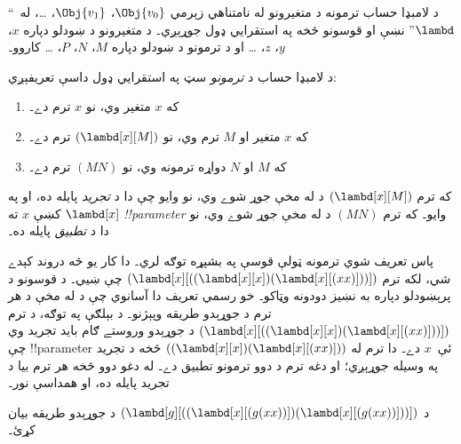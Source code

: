 \documentclass[../../../include/open-logic-section]{subfiles}
\begin{document}

د لامبډا حساب ترمونه د متغيرونو له نامتناهي زېرمي $\Obj{v_0}$،
$\Obj{v_1}$، \dots، له~``$\lambd$'' نښې او قوسونو څخه په استقرايي
ډول جوړېږي۔ د متغيرونو د ښودلو دپاره $x$، $y$، $z$، \dots{} او
د ترمونو د ښودلو دپاره $M$، $N$، $P$، \dots{} کاروو۔

\begin{defn}[ترمونه] 
د لامبډا حساب د \emph{ترمونو} سټ په استقرايي ډول داسې تعريفېږي:
\begin{enumerate}
  \item {} که $x$ متغير وي، نو $x$ ترم دے۔
  \item {} که $x$ متغير او $M$ ترم وي، نو
    $(\lambd[x][M])$ ترم دے۔
  \item {} که $M$ او $N$ دواړه ترمونه وي، نو
    $(MN)$ ترم دے۔
\end{enumerate}
\end{defn}

که ترم $(\lambd[x][M])$ د  له مخې جوړ شوے
وي، نو وايو چې دا د \emph{تجريد} پايله ده، او په $\lambd[x]$ کښې
$x$ ته \emph{!!{parameter}} وايو۔ که ترم $(MN)$ د
 له مخې جوړ شوے وي، نو دا د \emph{تطبيق}
پايله ده۔

پاس تعريف شوي ترمونه ټولې قوسې په بشپړه توګه لري۔ دا کار يو څه
دروند کېدے شي، لکه ترم
$(\lambd[x][((\lambd[x][x])(\lambd[x][(xx)]))])$ چې ښيي۔ د
قوسونو د پرېښودلو دپاره به نښيز دودونه وټاکو۔ خو رسمي تعريف دا
آسانوي چې د  له مخې د هر ترم د جوړېدو طريقه
وپېژنو۔ د بېلګې په توګه، د ترم
$(\lambd[x][((\lambd[x][x])(\lambd[x][(xx)]))])$ د جوړېدو وروستے
ګام بايد تجريد وي چې !!{parameter} ئې~$x$ دے۔ دا ترم له
$((\lambd[x][x])(\lambd[x][(xx)]))$ څخه د تجريد په وسيله جوړېږي؛
او دغه ترم د دوو ترمونو تطبيق دے۔ له دغو دوو څخه هر ترم بيا د
تجريد پايله ده، او همداسې نور۔

\begin{prob}
د $(\lambd[g][((\lambd[x][(g (x x))])
  (\lambd[x][(g (x x))]))])$ د جوړېدو طريقه بيان کړئ۔
\end{prob}
\end{document}
